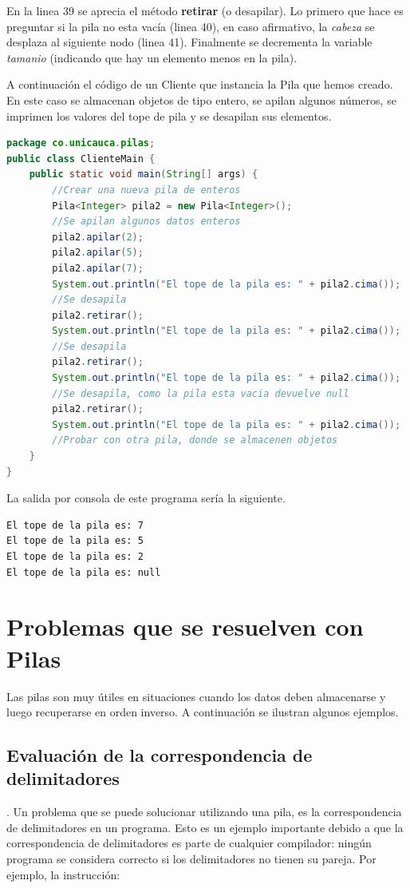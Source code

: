 En la linea 39 se aprecia el método \textbf{retirar} (o desapilar). Lo primero que hace es preguntar si la pila no esta vacía (linea 40), en caso afirmativo, la \textit{cabeza} se desplaza al siguiente nodo (linea 41). Finalmente se decrementa la variable \textit{tamanio} (indicando que hay un elemento menos en la pila).

A continuación el código de un Cliente que instancia la Pila que hemos creado. En este caso se almacenan objetos de tipo entero, se apilan algunos números, se imprimen los valores del tope de pila y se desapilan sus elementos.

\begin{lstlisting}[language=Java]
package co.unicauca.pilas;
public class ClienteMain {
	public static void main(String[] args) {
		//Crear una nueva pila de enteros
		Pila<Integer> pila2 = new Pila<Integer>();
		//Se apilan algunos datos enteros
		pila2.apilar(2);
		pila2.apilar(5);
		pila2.apilar(7);
		System.out.println("El tope de la pila es: " + pila2.cima());
		//Se desapila
		pila2.retirar();
		System.out.println("El tope de la pila es: " + pila2.cima());
		//Se desapila
		pila2.retirar();
		System.out.println("El tope de la pila es: " + pila2.cima());
		//Se desapila, como la pila esta vacia devuelve null
		pila2.retirar();
		System.out.println("El tope de la pila es: " + pila2.cima());
 		//Probar con otra pila, donde se almacenen objetos
 	}
}
\end{lstlisting}

La salida por consola de este programa sería la siguiente.

\begin{lstlisting}[numbers=none]
El tope de la pila es: 7
El tope de la pila es: 5
El tope de la pila es: 2
El tope de la pila es: null
\end{lstlisting}

\section{Problemas que se resuelven con Pilas}
Las pilas son muy útiles en situaciones cuando los datos deben almacenarse y luego recuperarse en orden inverso. A continuación se ilustran algunos ejemplos.

\subsection{Evaluación de la correspondencia de delimitadores}
. Un problema que se puede solucionar utilizando una pila, es la correspondencia de delimitadores en un programa.  Esto es un ejemplo importante debido a que la correspondencia de delimitadores es parte de cualquier compilador: ningún programa se considera correcto si los delimitadores no tienen su pareja. Por ejemplo, la instrucción:

